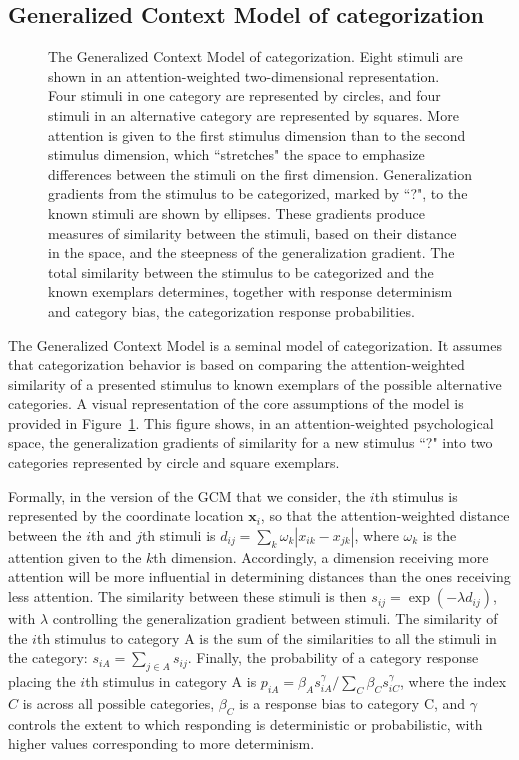 \subsection{Generalized Context Model of categorization}

\begin{figure}[t]
\begin{center}
\caption{The Generalized Context Model of categorization. Eight stimuli are shown in an attention-weighted two-dimensional representation. Four stimuli in one category are represented by circles, and four stimuli in an alternative category are represented by squares. More attention is given to the first stimulus dimension than to the second stimulus dimension, which ``stretches" the space to emphasize differences between the stimuli on the first dimension. Generalization gradients from the stimulus to be categorized, marked by ``?", to the known stimuli are shown by ellipses. These gradients produce measures of similarity between the stimuli, based on their distance in the space, and the steepness of the generalization gradient. The total similarity between the stimulus to be categorized and the known exemplars determines, together with response determinism and category bias,  the categorization response probabilities.}
\label{Categorization}
\end{center}
\end{figure}

The Generalized Context Model \cite<GCM:>{Nosofsky1986} is a seminal model of categorization. It assumes that categorization behavior is based on comparing the attention-weighted similarity of a presented stimulus to known exemplars of the possible alternative categories. A visual representation of the core assumptions of the model is provided in Figure~\ref{Categorization}. This figure shows, in an attention-weighted psychological space, the generalization gradients of similarity for a new stimulus ``?" into two categories represented by circle and square exemplars.

Formally, in the version of the GCM that we consider, the $i$th stimulus is represented by the coordinate location $\bm x_i$, so that the attention-weighted distance between the $i$th and $j$th stimuli is $d_{ij} = \sum_{k}\omega_k \left|x_{ik}-x_{jk}\right|$, where $\omega_k$ is the attention given to the $k$th dimension. Accordingly, a dimension receiving more attention will be more influential in determining distances than the ones receiving less attention. The similarity between these stimuli is then $s_{ij} = \exp\left(-\lambda d_{ij}\right)$, with $\lambda$ controlling the generalization gradient between stimuli. The similarity of the $i$th stimulus to category A is the sum of the similarities to all the stimuli in the category: $s_{iA} = \sum_{j \in A} s_{ij}$. Finally, the probability of a category response placing the $i$th stimulus in category A is $p_{iA}=\beta_A s_{iA}^\gamma/\sum_C \beta_C s_{iC}^\gamma$, where the index $C$ is across all possible categories, $\beta_C$ is a response bias to category C, and $\gamma$ controls the extent to which responding is deterministic or probabilistic, with higher values corresponding to more determinism.

